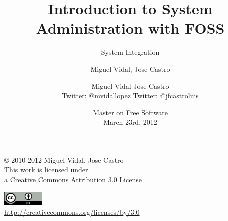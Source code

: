 \documentclass{beamer}
\begin{document}
\title{Introduction to System Administration with FOSS}
\subtitle{System Integration}
\author{Miguel Vidal, Jose Castro} 
\date{\footnotesize{Master on Free Software \\ March 23rd, 2012}}
\author{Miguel Vidal \hspace{1cm} Jose Castro \\
\hspace{0.5mm} {\tiny Twitter: @mvidallopez \hspace{1.1cm}Twitter: @jfcastroluis}
}



\begin{frame}
  \vspace{2cm}
  \begin{flushright}
    {\small \copyright{} 2010-2012 Miguel Vidal, Jose Castro} \\
    \medskip
    {\scriptsize This work is licensed under \\ a Creative Commons Attribution 3.0 License}
  \end{flushright}
  \begin{flushright}
    \href{http://creativecommons.org/licenses/by/3.0/es}{\includegraphics[width=2cm]{format/cc-by.png}} \\
    {\tiny \url{http://creativecommons.org/licenses/by/3.0}}
  \end{flushright}
\end{frame}%

\usebackgroundtemplate{}

\end{document}
